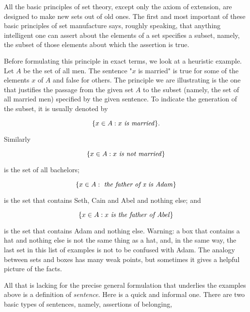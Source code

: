 
All the basic principles of set theory, except only the axiom of extension, are designed to make new sets out of old ones. The first and most important of these basic principles of set manufacture says, roughly speaking, that anything intelligent one can assert about the elements of a set specifies a subset, namely, the subset of those elements about which the assertion is true.

Before formulating this principle in exact terms, we look at a heuristic example. Let $A$ be the set of all men. The sentence "$x$ is married" is true for some of the elements $x$ of $A$ and false for others. The principle we are illustrating is the one that justifies the passage from the given set $A$ to the subset (namely, the set of all married men) specified by the given sentence. To indicate the generation of the subset, it is usually denoted by 

\begin{equation*}
\{ x \in A: x \text{ \textit{is married}} \}.
\end{equation*}

Similarly 

\begin{equation*}
\{ x \in A: x \text{ \textit{is not married}} \}
\end{equation*}

is the set of all bachelors; 

\begin{equation*}
\{ x \in A: \text{ \textit{the father of x is Adam}} \} 
\end{equation*}

is the set that contains Seth, Cain and Abel and nothing else; and

\begin{equation*}
\{ x \in A: x \text{ \textit{is the father of Abel}} \}  
\end{equation*}

is the set that contains Adam and nothing else. Warning: a box that contains a hat and nothing else is not the same thing as a hat, and, in the same way, the last set in this list of examples is not to be confused with Adam. The analogy between sets and boxes has many weak points, but sometimes it gives a helpful picture of the facts. 

All that is lacking for the precise general formulation that underlies the examples above is a definition of \textit{sentence}. Here is a quick and informal one. There are two basic types of sentences, namely, assertions of belonging,

